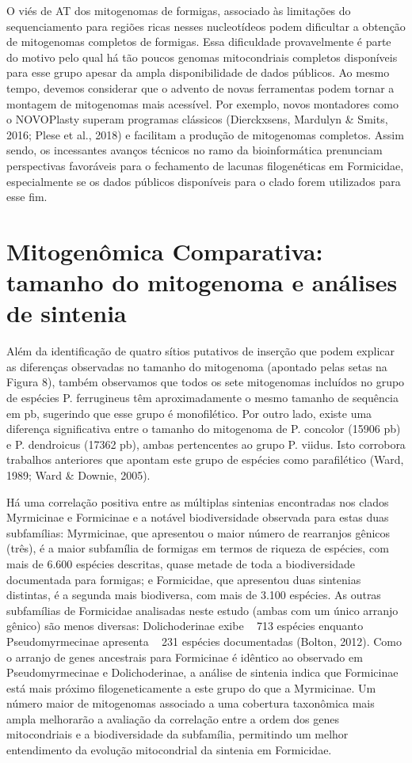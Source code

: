 \documentclass[../DISSERTACAO_MAIN.tex]{subfiles}
\begin{document}
	O viés de AT dos mitogenomas de formigas, associado às limitações do sequenciamento para regiões ricas nesses nucleotídeos podem dificultar a obtenção de mitogenomas completos de formigas. Essa dificuldade provavelmente é parte do motivo pelo qual há tão poucos genomas mitocondriais completos disponíveis para esse grupo apesar da ampla disponibilidade de dados públicos. Ao mesmo tempo, devemos considerar que o advento de novas ferramentas podem tornar a montagem de mitogenomas mais acessível. Por exemplo, novos montadores como o NOVOPlasty superam programas clássicos (Dierckxsens, Mardulyn \& Smits, 2016; Plese et al., 2018) e facilitam a produção de mitogenomas completos. Assim sendo, os incessantes avanços técnicos no ramo da bioinformática prenunciam perspectivas favoráveis para o fechamento de lacunas filogenéticas em Formicidae, especialmente se os dados públicos disponíveis para o clado forem utilizados para esse fim.
	
	\section{Mitogenômica Comparativa: tamanho do mitogenoma e análises de sintenia}
	
	Além da identificação de quatro sítios putativos de inserção que podem explicar as diferenças observadas no tamanho do mitogenoma (apontado pelas setas na Figura 8), também observamos que todos os sete mitogenomas incluídos no grupo de espécies P. ferrugineus têm aproximadamente o mesmo tamanho de sequência em pb, sugerindo que esse grupo é monofilético. Por outro lado, existe uma diferença significativa entre o tamanho do mitogenoma de P. concolor (15906 pb) e P. dendroicus (17362 pb), ambas pertencentes ao grupo P. viidus. Isto corrobora trabalhos anteriores que apontam este grupo de espécies como parafilético (Ward, 1989; Ward \& Downie, 2005).
	
	Há uma correlação positiva entre as múltiplas sintenias encontradas nos clados Myrmicinae e Formicinae e a notável biodiversidade observada para estas duas subfamílias: Myrmicinae, que apresentou o maior número de rearranjos gênicos (três), é a maior subfamília de formigas em termos de riqueza de espécies, com mais de 6.600 espécies descritas, quase metade de toda a biodiversidade documentada para formigas; e Formicidae, que apresentou duas sintenias distintas, é a segunda mais biodiversa, com mais de 3.100 espécies. As outras subfamílias de Formicidae analisadas neste estudo (ambas com um único arranjo gênico) são menos diversas: Dolichoderinae exibe ~ 713 espécies enquanto Pseudomyrmecinae apresenta ~ 231 espécies documentadas (Bolton, 2012). Como o arranjo de genes ancestrais para Formicinae é idêntico ao observado em Pseudomyrmecinae e Dolichoderinae, a análise de sintenia indica que Formicinae está mais próximo filogeneticamente a este grupo do que a Myrmicinae. Um número maior de mitogenomas associado a uma cobertura taxonômica mais ampla melhorarão a avaliação da correlação entre a ordem dos genes mitocondriais e a biodiversidade da subfamília, permitindo um melhor entendimento da evolução mitocondrial da sintenia em Formicidae.
	
\end{document}
